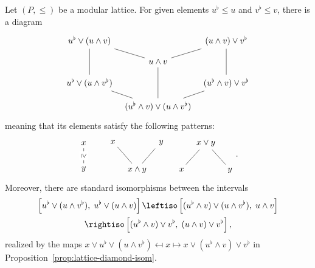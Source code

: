 \begin{theorem}\label{prop:lattice-Zassenhaus}
	Let $(P,\leq)$ be a modular lattice. For given elements
	$u^\flat\leq u$ and $v^\flat\leq v$, there is a diagram
	\[ \begin{tikzcd}[column sep=tiny, row sep=small]
		u^\flat \vee (u \wedge v) \arrow[dash, dd] \arrow[dash, rd] & & (u \wedge v) \vee v^\flat \arrow[dash, dd] \arrow[dash, ld] \\
		& u \wedge v \arrow[dash, dd] & \\
		u^\flat \vee (u \wedge v^\flat) \arrow[dash, rd] & & (u^\flat \wedge v) \vee v^\flat \arrow[dash, ld] \\
		& (u^\flat \wedge v) \vee (u \wedge v^\flat)
	\end{tikzcd} \]
	meaning that its elements satisfy the following patterns:
	\begin{equation}\label{eqn:Zassenhaus-cases}
	\begin{tikzcd}
		x \arrow[dash, d, "\geq" description, sloped] \\ y
	\end{tikzcd} \qquad
	\begin{tikzcd}[column sep=tiny]
		x \arrow[dash, rd] & & y \arrow[dash, ld] \\
		& x \wedge y &
	\end{tikzcd} \quad
	\begin{tikzcd}[column sep=tiny]
		{} & x \vee y \arrow[dash, ld] \arrow[dash, rd] & \\
		x & & y
	\end{tikzcd} .
	\end{equation}
	Moreover, there are standard isomorphisms between the intervals
	\begin{multline*}
		\left[ u^\flat \vee (u \wedge v^\flat), \; u^\flat \vee (u \wedge v) \right] \leftiso \left[ (u^\flat \wedge v) \vee (u \wedge v^\flat), \; u \wedge v \right] \\
		\rightiso \left[ (u^\flat \wedge v) \vee v^\flat, \; (u \wedge v) \vee v^\flat \right],
	\end{multline*}
	realized by the maps
	$x\vee u^\flat\vee(u\wedge v^\flat)\mapsfrom x\mapsto
	x\vee(u^\flat\wedge v)\vee v^\flat$ in
	Proposition~\ref{prop:lattice-diamond-isom}.
\end{theorem}
